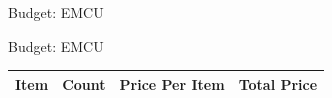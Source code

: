 \documentclass{beamer}
\begin{document}
\begin{frame} {Budget: EMCU}
\begin{tabularx} {\textwidth}

        \bottomrule

    \end{tabularx}

\end{frame}


\begin{frame} {Budget: EMCU}

    \begin{tabularx} {\textwidth} {
            >{\raggedright \arraybackslash}m{5cm}
            >{\centering \arraybackslash}X
            >{\centering \arraybackslash}X
            >{\centering \arraybackslash}X
        }

        \toprule

        Item   & Count & Price Per Item & Total Price \\
        \midrule



\end{tabularx}
\end{frame}
\end{document}
